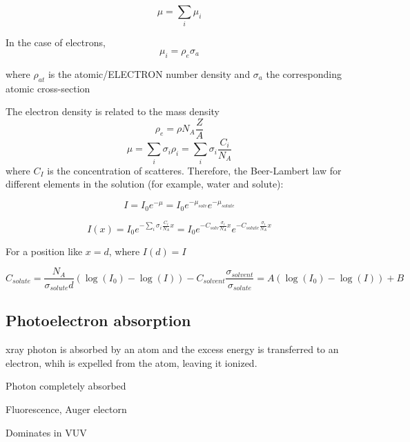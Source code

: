 \begin{equation}
        \mu = \sum_i \mu_i
\end{equation}

In the case of electrons, 
\begin{equation}
        \mu_i = \rho_{e} \sigma_a
\end{equation}

where $\rho_{at}$ is the atomic/ELECTRON number density and $\sigma_a$ the corresponding atomic cross-section

The electron density is related to the mass density
\begin{equation}
        \rho_e = \rho N_A \frac{Z}{A}
\end{equation}
\begin{equation}
        \mu = \sum_i \sigma_i \rho_i =\sum_i \sigma_i \frac{C_i}{N_A}
\end{equation}
where $C_I$ is the concentration of scatteres. Therefore, the Beer-Lambert law for different elements in the solution (for example, water and solute):

\begin{equation}
        I = I_0 e^{-\mu} = I_0e^{-\mu_{solv}}e^{-\mu_{solute}}
\end{equation}

\begin{equation}
        I(x) = I_0 e^{-\sum_i \sigma_i \frac{C_i}{N_A} x} =  I_0e^{-C_{solv} \frac{\sigma_i}{N_A}x}e^{-C_{solute} \frac{\sigma_i}{N_A}x}
\end{equation}

For a position like $x=d$, where $I(d)=I$

\begin{equation}
        C_{solute}=\frac{N_A}{\sigma_{solute}d}\left( \log(I_0) - \log(I) \right) - C_{solvent} \frac{\sigma_{solvent}}{\sigma_{solute}}=A \left( \log(I_0) - \log(I) \right) + B
\end{equation}

\subsection{Photoelectron absorption}

xray photon is absorbed by an atom and the excess energy is transferred to an electron, whih is expelled from the atom, leaving it ionized.

Photon completely absorbed

Fluorescence, Auger electorn

Dominates in VUV

